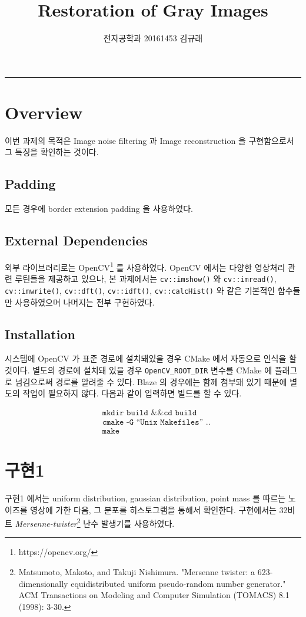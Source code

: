 \documentclass[a4paper, 12p]{paper}
\date{\vspace{-5ex}}
\title{Restoration of Gray Images}
\author{전자공학과 20161453 김규래}
\def\code#1{\texttt{#1}}
\begin{document}
 
\maketitle\hrule{}\bigskip

\section{Overview}
이번 과제의 목적은 Image noise filtering 과 Image reconstruction 을 구현함으로서 그 특징을 확인하는 것이다. 

\subsection{Padding}
모든 경우에 border extension padding 을 사용하였다.

\subsection{External Dependencies}
외부 라이브러리로는 OpenCV\footnote{https://opencv.org/} 를 사용하였다. OpenCV 에서는 다양한 영상처리 관련 루틴들을 제공하고 있으나, 본 과제에서는 \code{cv::imshow()} 와 \code{cv::imread()}, \code{cv::imwrite()}, \code{cv::dft()}, \code{cv::idft()}, \code{cv::calcHist()} 와 같은 기본적인 함수들만 사용하였으며 나머지는 전부 구현하였다.

\subsection{Installation}
시스템에 OpenCV 가 표준 경로에 설치돼있을 경우 CMake 에서 자동으로 인식을 할 것이다. 별도의 경로에 설치돼 있을 경우 \code{OpenCV\_ROOT\_DIR} 변수를 CMake 에 플래그로 넘김으로써 경로를 알려줄 수 있다. Blaze 의 경우에는 함께 첨부돼 있기 때문에 별도의 작업이 필요하지 않다. 다음과 같이 입력하면 빌드를 할 수 있다. 

\begin{align*}
  & \code{mkdir build \&\& cd build} \\
  & \code{cmake -G ``Unix Makefiles'' ..} \\
  & \code{make}
\end{align*}

\section{구현1}
구현1 에서는 uniform distribution, gaussian distribution, point mass 를 따르는 노이즈를 영상에 가한 다음, 그 분포를 히스토그램을 통해서 확인한다. 구현에서는 32비트 \textit{Mersenne-twister}\footnote{Matsumoto, Makoto, and Takuji Nishimura. "Mersenne twister: a 623-dimensionally equidistributed uniform pseudo-random number generator." ACM Transactions on Modeling and Computer Simulation (TOMACS) 8.1 (1998): 3-30.} 난수 발생기를 사용하였다.
\end{document}

